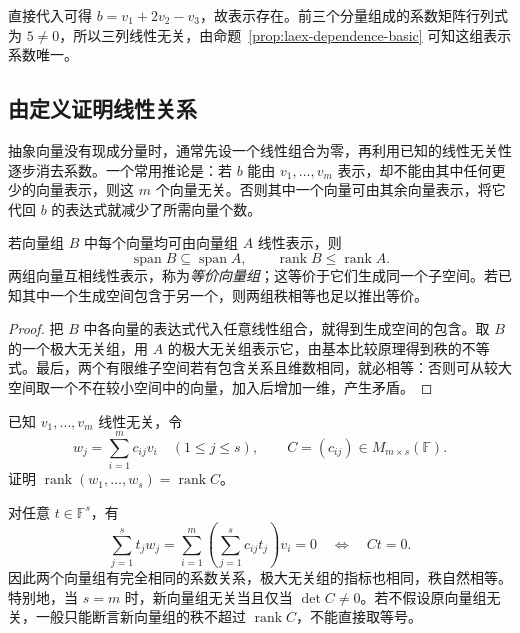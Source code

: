\begin{solve}
直接代入可得 $b=v_1+2v_2-v_3$，故表示存在。前三个分量组成的系数矩阵行列式为 $5\ne0$，所以三列线性无关，由命题~\ref{prop:laex-dependence-basic} 可知这组表示系数唯一。
\end{solve}

\subsection{由定义证明线性关系}

抽象向量没有现成分量时，通常先设一个线性组合为零，再利用已知的线性无关性逐步消去系数。一个常用推论是：若 $b$ 能由 $v_1,\ldots,v_m$ 表示，却不能由其中任何更少的向量表示，则这 $m$ 个向量无关。否则其中一个向量可由其余向量表示，将它代回 $b$ 的表达式就减少了所需向量个数。

\begin{proposition}
\label{prop:laex-generating-rank}
若向量组 $B$ 中每个向量均可由向量组 $A$ 线性表示，则
\[
\operatorname{span}B\subseteq\operatorname{span}A,
\qquad \operatorname{rank}B\le\operatorname{rank}A.
\]
两组向量互相线性表示，称为\emph{等价向量组}；这等价于它们生成同一个子空间。若已知其中一个生成空间包含于另一个，则两组秩相等也足以推出等价。
\end{proposition}

\begin{proof}
把 $B$ 中各向量的表达式代入任意线性组合，就得到生成空间的包含。取 $B$ 的一个极大无关组，用 $A$ 的极大无关组表示它，由基本比较原理得到秩的不等式。最后，两个有限维子空间若有包含关系且维数相同，就必相等：否则可从较大空间取一个不在较小空间中的向量，加入后增加一维，产生矛盾。
\end{proof}

\begin{example}
\label{ex:laex-coefficient-matrix}
已知 $v_1,\ldots,v_m$ 线性无关，令
\[
w_j=\sum_{i=1}^m c_{ij}v_i\quad(1\le j\le s),
\qquad C=(c_{ij})\in M_{m\times s}(\mathbb F).
\]
证明 $\operatorname{rank}(w_1,\ldots,w_s)=\operatorname{rank}C$。
\end{example}

\begin{solve}
对任意 $t\in\mathbb F^s$，有
\[
\sum_{j=1}^s t_jw_j
=\sum_{i=1}^m\left(\sum_{j=1}^s c_{ij}t_j\right)v_i=0
\quad\Longleftrightarrow\quad Ct=0.
\]
因此两个向量组有完全相同的系数关系，极大无关组的指标也相同，秩自然相等。特别地，当 $s=m$ 时，新向量组无关当且仅当 $\det C\ne0$。若不假设原向量组无关，一般只能断言新向量组的秩不超过 $\operatorname{rank}C$，不能直接取等号。
\end{solve}

